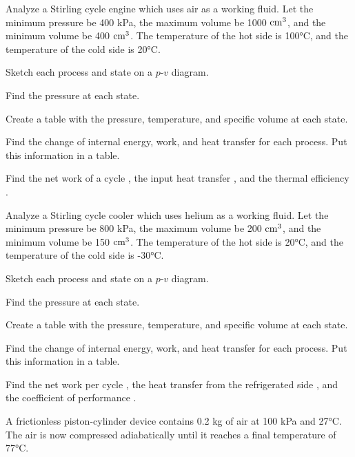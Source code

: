 \begin{homework}
  \question Analyze a Stirling cycle engine which uses air as a working fluid.  Let the minimum pressure be 400 kPa, the maximum volume be 1000 $\rm cm^3$, and the minimum volume be 400 $\rm cm^3$.  The temperature of the hot side is 100°C, and the temperature of the cold side is 20°C.
  \begin{questionparts}
  \item Sketch each process and state on a $p$-$v$ diagram.
  \item Find the pressure at each state. \answer{[$p_1 = 400 \rm kPa$, $p_2 = 1000 \rm kPa$, $p_3 = 1273 \rm kPa$, $p_4 = 509 \rm kPa$]}
  \item Create a table with the pressure, temperature, and specific volume at each state.
  \item Find the change of internal energy, work, and heat transfer for each process.  Put this information in a table.
  \item Find the net work of a cycle \answer{[100 J]}, the input heat transfer \answer{[466 J]}, and the thermal efficiency \answer{[21\%]}.
  \end{questionparts}
  \newpage
   \question Analyze a Stirling cycle cooler which uses helium as a working fluid.  Let the minimum pressure be 800 kPa, the maximum volume be 200 $\rm cm^3$, and the minimum volume be 150 $\rm cm^3$.  The temperature of the hot side is 20°C, and the temperature of the cold side is -30°C.
  \begin{questionparts}
  \item Sketch each process and state on a $p$-$v$ diagram.
  \item Find the pressure at each state. \answer{[$p_1 = 965 \rm kPa$, $p_2 = 1286 \rm kPa$, $p_3 = 1067 \rm kPa$, $p_4 = 800 \rm kPa$]}
  \item Create a table with the pressure, temperature, and specific volume at each state.
  \item Find the change of internal energy, work, and heat transfer for each process.  Put this information in a table.
  \item Find the net work per cycle \answer{[-9.5 J]}, the heat transfer from the refrigerated side \answer{[46 J]}, and the coefficient of performance \answer{[4.86]}.
  \end{questionparts}
  \question A frictionless piston-cylinder device contains 0.2 kg of air at 100 kPa and 27°C. The air is now compressed adiabatically until it reaches a final temperature of 77°C.


\end{homework}
